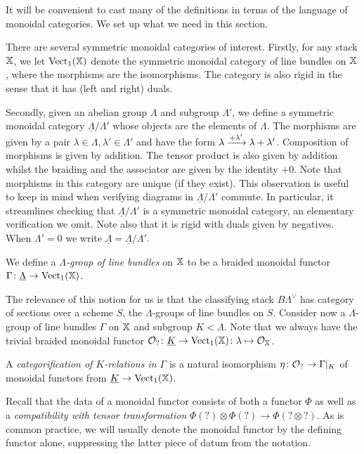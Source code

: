 \documentclass[12pt]{amsart}
\begin{document}
It will be convenient to cast many of the definitions in terms of the language of monoidal categories. We set up what we need in this section.

There are several symmetric monoidal categories of interest. Firstly, for any stack $\mathbb{X}$, we let $\operatorname{Vect}_1 (\mathbb{X})$ denote the symmetric monoidal category of line bundles on $\mathbb{X}$, where the morphisms are the isomorphisms. The category is also rigid in the sense that it has (left and right) duals. 


Secondly, given an abelian group $\Lambda$ and subgroup $\Lambda'$, we define a symmetric monoidal category $\underline{\Lambda}/\Lambda'$ whose objects are the elements of $\Lambda$. The morphisms are given by a pair $\lambda \in \Lambda, \lambda' \in \Lambda'$ and have the form $\lambda \xrightarrow{+\lambda'} \lambda + \lambda'$. Composition of morphisms is given by addition. The tensor product is also given by addition whilst the braiding and the associator are given by the identity $+0$. Note that morphisms in this category are unique (if they exist). This observation is useful to keep in mind when verifying diagrams in $\underline{\Lambda}/\Lambda'$ commute. In particular, it streamlines checking that $\underline{\Lambda}/\Lambda'$ is a symmetric monoidal category, an elementary verification we omit. Note also that it is rigid with duals given by negatives. When $\Lambda' = 0$ we write $\underline{\Lambda} = \underline{\Lambda}/\Lambda'$.

\begin{definition} \label{def:groupline}
We define a {\em $\Lambda$-group of line bundles} on $\mathbb{X}$ to be a braided monoidal functor $\Gamma \colon \underline{\Lambda} \rightarrow \operatorname{Vect}_1(\mathbb{X})$.
\end{definition}
The relevance of this notion for us is that the classifying stack $B\Lambda^{\vee}$ has category of sections over a scheme $S$, the $\Lambda$-groups of line bundles on $S$. Consider now a $\Lambda$-group of line bundles $\Gamma$ on $\mathbb{X}$ and subgroup $K < \Lambda$. Note that we always have the trivial braided monoidal functor $\mathcal{O}_? \colon \underline{K} \to \operatorname{Vect}_1(\mathbb{X}) \colon \lambda \mapsto \mathcal{O}_{\mathbb{X}}$. 
\begin{definition}   \label{def:categorifyrel}
A {\em categorification of $K$-relations in $\Gamma$} is a natural isomorphism $\eta \colon \mathcal{O}_? \to \Gamma |_K$ of monoidal functors from $\underline{K} \to \operatorname{Vect}_1(\mathbb{X})$. 
\end{definition}

Recall that the data of a monoidal functor consists of both a functor $\Phi$ as well as a {\em compatibility with tensor transformation} $\Phi(?) \otimes \Phi(?) \to \Phi(? \otimes ?)$. As is common practice, we will usually denote the monoidal functor by the defining functor alone, suppressing the latter piece of datum from the notation. 
\end{document}
